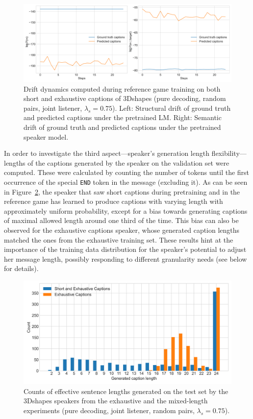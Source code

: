 \begin{figure}[h]
	\centering
	\includegraphics[width=\linewidth]{images/3dshapes_wShort_structural_semantic_drift_49_pure_075_random.png}
	\caption{Drift dynamics computed during reference game training on both short and exhaustive captions of 3Dshapes (pure decoding, random pairs, joint listener, $\lambda_s=0.75$). Left: Structural drift of ground truth and predicted captions under the pretrained LM. Right: Semantic drift of ground truth and predicted captions under the pretrained speaker model.}
	\label{fig:3dshapes_wShort_075_str_sem_drift}
\end{figure}

In order to investigate the third aspect---speaker's generation length flexibility---lengths of the captions generated by the speaker on the validation set were computed. These were calculated by counting the number of tokens until the first occurrence of the special \texttt{END} token in the message (excluding it). As can be seen in Figure~\ref{fig:3dshapes_exh_short_random_lengths}, the speaker that saw short captions during pretraining and in the reference game has learned to produce captions with varying length with approximately uniform probability, except for a bias towards generating captions of maximal allowed length around one third of the time. This bias can also be observed for the exhaustive captions speaker, whose generated caption lengths matched the ones from the exhaustive training set. These results hint at the importance of the training data distribution for the speaker's potential to adjust her message length, possibly responding to different granularity needs (see below for details). 

\begin{figure}[h]
	\centering
	\includegraphics[width=0.7\linewidth]{images/3dshapes_exh_short_random_length_counts.png}
	\caption{Counts of effective sentence lengths generated on the test set by the 3Dshapes speakers from the exhaustive and the mixed-length experiments (pure decoding, joint listener, random pairs, $\lambda_s = 0.75$).}
	\label{fig:3dshapes_exh_short_random_lengths}
\end{figure}

